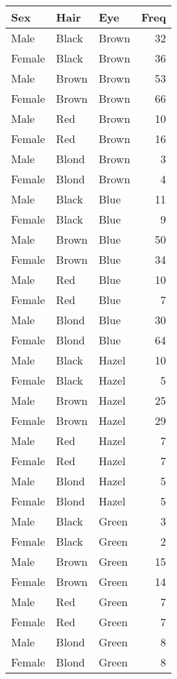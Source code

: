 \documentclass[
]{article}
\begin{document}
\begin{tabular}{l|l|l|r}
\hline
Sex & Hair & Eye & Freq\\
\hline
Male & Black & Brown & 32\\
\hline
Female & Black & Brown & 36\\
\hline
Male & Brown & Brown & 53\\
\hline
Female & Brown & Brown & 66\\
\hline
Male & Red & Brown & 10\\
\hline
Female & Red & Brown & 16\\
\hline
Male & Blond & Brown & 3\\
\hline
Female & Blond & Brown & 4\\
\hline
Male & Black & Blue & 11\\
\hline
Female & Black & Blue & 9\\
\hline
Male & Brown & Blue & 50\\
\hline
Female & Brown & Blue & 34\\
\hline
Male & Red & Blue & 10\\
\hline
Female & Red & Blue & 7\\
\hline
Male & Blond & Blue & 30\\
\hline
Female & Blond & Blue & 64\\
\hline
Male & Black & Hazel & 10\\
\hline
Female & Black & Hazel & 5\\
\hline
Male & Brown & Hazel & 25\\
\hline
Female & Brown & Hazel & 29\\
\hline
Male & Red & Hazel & 7\\
\hline
Female & Red & Hazel & 7\\
\hline
Male & Blond & Hazel & 5\\
\hline
Female & Blond & Hazel & 5\\
\hline
Male & Black & Green & 3\\
\hline
Female & Black & Green & 2\\
\hline
Male & Brown & Green & 15\\
\hline
Female & Brown & Green & 14\\
\hline
Male & Red & Green & 7\\
\hline
Female & Red & Green & 7\\
\hline
Male & Blond & Green & 8\\
\hline
Female & Blond & Green & 8\\
\hline
\end{tabular}
\end{document}

